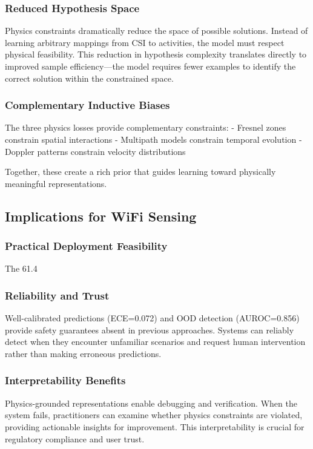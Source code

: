 \documentclass[10pt,journal,compsoc]{IEEEtran}
\begin{document}
\subsubsection{Reduced Hypothesis Space}
Physics constraints dramatically reduce the space of possible solutions. Instead of learning arbitrary mappings from CSI to activities, the model must respect physical feasibility. This reduction in hypothesis complexity translates directly to improved sample efficiency—the model requires fewer examples to identify the correct solution within the constrained space.

\subsubsection{Complementary Inductive Biases}
The three physics losses provide complementary constraints:
- Fresnel zones constrain spatial interactions
- Multipath models constrain temporal evolution
- Doppler patterns constrain velocity distributions

Together, these create a rich prior that guides learning toward physically meaningful representations.

\subsection{Implications for WiFi Sensing}

\subsubsection{Practical Deployment Feasibility}
The 61.4%

\subsubsection{Reliability and Trust}
Well-calibrated predictions (ECE=0.072) and OOD detection (AUROC=0.856) provide safety guarantees absent in previous approaches. Systems can reliably detect when they encounter unfamiliar scenarios and request human intervention rather than making erroneous predictions.

\subsubsection{Interpretability Benefits}
Physics-grounded representations enable debugging and verification. When the system fails, practitioners can examine whether physics constraints are violated, providing actionable insights for improvement. This interpretability is crucial for regulatory compliance and user trust.
\end{document}
